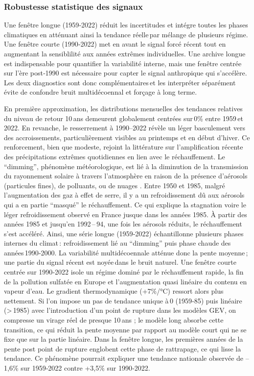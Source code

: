 \documentclass[
  article,
  nofooter,
  noheadings]{jss}
\begin{document}
\subsubsection{Robustesse statistique des
signaux}\label{robustesse-statistique-des-signaux}

Une fenêtre longue (1959‑2022) réduit les incertitudes et intégre toutes
les phases climatiques en atténuant ainsi la tendance réelle\,par
mélange de plusieurs régime. Une fenêtre courte (1990‑2022) met en avant
le signal forcé récent tout en augmentant la sensiblilité aux années
extrêmes individuelles. Une archive longue est indispensable pour
quantifier la variabilité interne, mais une fenêtre centrée sur l'ère
post‑1990 est nécessaire pour capter le signal anthropique qui
s'accélère. Les deux diagnostics sont donc complémentaires\,et les
interpréter séparément évite de confondre bruit multidécoennal et
forçage à long terme.

En première approximation, les distributions mensuelles des tendances
relatives du niveau de retour 10\,ans demeurent globalement centrées
sur\,0\% entre 1959\,et\,2022. En revanche, le resserrement à 1990--2022
révèle un léger basculement vers des accroissements, particulièrement
visibles au printemps et en début d'hiver. Ce renforcement, bien que
modeste, rejoint la littérature sur l'amplification récente des
précipitations extrêmes quotidiennes en lien avec le réchauffement. Le
``dimming'', phénomène météorologique, est lié à la diminution de la
transmission du rayonnement solaire à travers l'atmosphère en raison de
la présence d'aérosols (particules fines), de polluants, ou de nuages
\citep{Wild2009_GlobalDimmingBrightening}. Entre 1950 et 1985, malgré
l'augmentation des gaz à effet de serre, il y a un refroidissement dû
aux aérosols qui a en partie ``masqué'' le réchauffement. Ce qui
explique la stagnation voire le léger refroidissement observé en France
jusque dans les années 1985. À partir des années 1985 et jusqu'en
1992\,--\,94, une fois les aérosols réduits, le réchauffement s'est
accéléré. Ainsi, une série longue (1959‑2022) échantillonne plusieurs
phases internes du climat\,: refroidissement lié au ``dimming'' puis
phase chaude des années\,1990‑2000. La variabilité multidécoennale
atténue donc la pente moyenne\,; une partie du signal récent est
noyée\,dans le bruit naturel. Une fenêtre courte centrée sur 1990‑2022
isole un régime dominé par le réchauffement rapide, la fin de la
pollution sulfatée en Europe et l'augmentation quasi linéaire du contenu
en vapeur d'eau. Le gradient thermodynamique (+7\%/°C) ressort alors
plus nettement. Si l'on impose un pas de tendance unique à\,0 (1959‑85)
puis linéaire (\textgreater\,1985) avec l'introduction d'un point de
rupture dans les modèles GEV, on compresse un virage réel de presque
10\,ans ; le modèle long absorbe cette transition, ce qui réduit la
pente moyenne par rapport au modèle court qui ne se fixe que sur la
partie linéaire. Dans la fenêtre longue, les premières années de la
pente post point de rupture englobent cette phase de rattrapage, ce qui
lisse la tendance. Ce phénomène pourrait expliquer une tendance
nationale observée de --1,6\% sur 1959‑2022 contre +3,5\% sur 1990‑2022.
\end{document}
